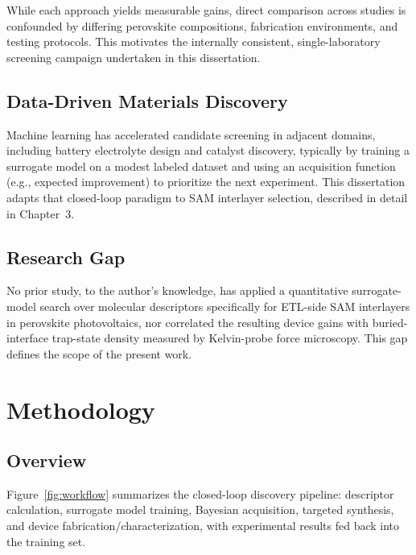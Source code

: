 \documentclass[12pt,a4paper,oneside]{report}
\begin{document}
While each approach yields measurable gains, direct comparison across
studies is confounded by differing perovskite compositions, fabrication
environments, and testing protocols. This motivates the internally
consistent, single-laboratory screening campaign undertaken in this
dissertation.

\section{Data-Driven Materials Discovery}

Machine learning has accelerated candidate screening in adjacent domains,
including battery electrolyte design and catalyst discovery, typically by
training a surrogate model on a modest labeled dataset and using an
acquisition function (e.g., expected improvement) to prioritize the next
experiment. This dissertation adapts that closed-loop paradigm to SAM
interlayer selection, described in detail in Chapter~3.

\section{Research Gap}

No prior study, to the author's knowledge, has applied a quantitative
surrogate-model search over molecular descriptors specifically for
ETL-side SAM interlayers in perovskite photovoltaics, nor correlated the
resulting device gains with buried-interface trap-state density measured
by Kelvin-probe force microscopy. This gap defines the scope of the
present work.

\chapter{Methodology}

\section{Overview}

Figure~\ref{fig:workflow} summarizes the closed-loop discovery pipeline:
descriptor calculation, surrogate model training, Bayesian acquisition,
targeted synthesis, and device fabrication/characterization, with
experimental results fed back into the training set.
\end{document}
